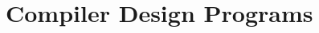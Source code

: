 \documentclass{report}
\begin{document}

\newpage
\large{\tableofcontents}
\clearpage
{}

\chapter{Compiler Design Programs}

\end{document}
